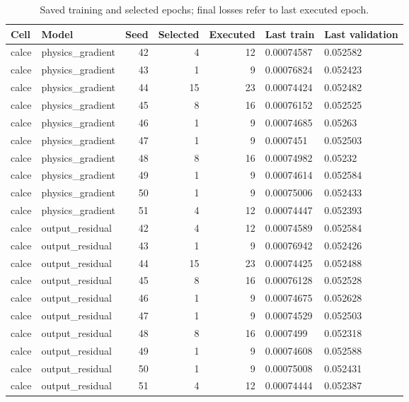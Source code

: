 \begin{table}[!t]
\centering
\footnotesize
\caption{Saved training and selected epochs; final losses refer to last executed epoch.}
\label{tab:reviewer-epochs-3}
\setlength{\tabcolsep}{3pt}
\begin{tabular}{llrrr p{} p{}}
\toprule
Cell & Model & Seed & Selected & Executed & Last train & Last validation \\
\midrule
calce & physics\_gradient & 42 & 4 & 12 & 0.00074587 & 0.052582 \\
calce & physics\_gradient & 43 & 1 & 9 & 0.00076824 & 0.052423 \\
calce & physics\_gradient & 44 & 15 & 23 & 0.00074424 & 0.052482 \\
calce & physics\_gradient & 45 & 8 & 16 & 0.00076152 & 0.052525 \\
calce & physics\_gradient & 46 & 1 & 9 & 0.00074685 & 0.05263 \\
calce & physics\_gradient & 47 & 1 & 9 & 0.0007451 & 0.052503 \\
calce & physics\_gradient & 48 & 8 & 16 & 0.00074982 & 0.05232 \\
calce & physics\_gradient & 49 & 1 & 9 & 0.00074614 & 0.052584 \\
calce & physics\_gradient & 50 & 1 & 9 & 0.00075006 & 0.052433 \\
calce & physics\_gradient & 51 & 4 & 12 & 0.00074447 & 0.052393 \\
calce & output\_residual & 42 & 4 & 12 & 0.00074589 & 0.052584 \\
calce & output\_residual & 43 & 1 & 9 & 0.00076942 & 0.052426 \\
calce & output\_residual & 44 & 15 & 23 & 0.00074425 & 0.052488 \\
calce & output\_residual & 45 & 8 & 16 & 0.00076128 & 0.052528 \\
calce & output\_residual & 46 & 1 & 9 & 0.00074675 & 0.052628 \\
calce & output\_residual & 47 & 1 & 9 & 0.00074529 & 0.052503 \\
calce & output\_residual & 48 & 8 & 16 & 0.0007499 & 0.052318 \\
calce & output\_residual & 49 & 1 & 9 & 0.00074608 & 0.052588 \\
calce & output\_residual & 50 & 1 & 9 & 0.00075008 & 0.052431 \\
calce & output\_residual & 51 & 4 & 12 & 0.00074444 & 0.052387 \\
\bottomrule
\end{tabular}
\end{table}

